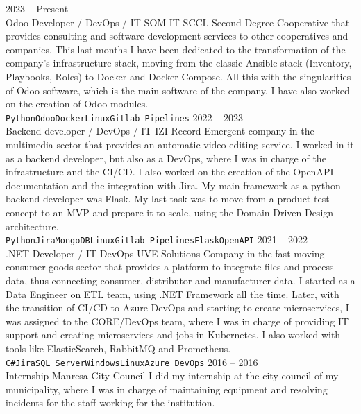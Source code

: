 \documentclass[9pt]{developercv} %
\begin{document}
\begin{entrylist}

	\entry
		{2023 -- Present\\}
		{Odoo Developer / DevOps / IT}
		{SOM IT SCCL}
		{Second Degree Cooperative that provides consulting and software development services to other cooperatives and companies. 
		This last months I have been dedicated to the transformation of the company's infrastructure stack, moving from the classic Ansible stack (Inventory, Playbooks, Roles) to Docker and Docker Compose. All this with the singularities of Odoo software, which is the main software of the company. I have also worked on the creation of Odoo modules.
		\\ \texttt{Python}\slashsep\texttt{Odoo}\slashsep\texttt{Docker}\slashsep\texttt{Linux}\slashsep\texttt{Gitlab Pipelines}
		}
	\entry
		{2022 -- 2023\\}
		{Backend developer / DevOps / IT}
		{IZI Record}
		{Emergent company in the multimedia sector that provides an automatic video editing service.
		I worked in it as a backend developer, but also as a DevOps, where I was in charge of the infrastructure and the CI/CD. I also worked on the creation of the OpenAPI documentation and the integration with Jira. My main framework as a python backend developer was Flask. My last task was to move from a product test concept to an MVP and prepare it to scale, using the Domain Driven Design architecture.
		\\ \texttt{Python}\slashsep\texttt{Jira}\slashsep\texttt{MongoDB}\slashsep\texttt{Linux}\slashsep\texttt{Gitlab Pipelines}\slashsep\texttt{Flask}\slashsep\texttt{OpenAPI}
		}
	\entry
		{2021 -- 2022\\}
		{.NET Developer / IT DevOps}
		{UVE Solutions}
		{Company in the fast moving consumer goods sector that provides a platform to integrate files and process data, thus connecting consumer, distributor and manufacturer data.
		I started as a Data Engineer on ETL team, using .NET Framework all the time. Later, with the transition of CI/CD to Azure DevOps and starting to create microservices, I was assigned to the CORE/DevOps team, where I was in charge of providing IT support and creating microservices and jobs in Kubernetes. I also worked with tools like ElasticSearch, RabbitMQ and Prometheus. 
		\\ \texttt{C\#}\slashsep\texttt{Jira}\slashsep\texttt{SQL Server}\slashsep\texttt{Windows}\slashsep\texttt{Linux}\slashsep\texttt{Azure DevOps}
		}
	\entry
		{2016 -- 2016\\}
		{Internship}
		{Manresa City Council}
		{ 
			I did my internship at the city council of my municipality, where I was in charge of maintaining equipment and resolving incidents for the staff working for the institution.
			}

\end{entrylist}
\end{document}
